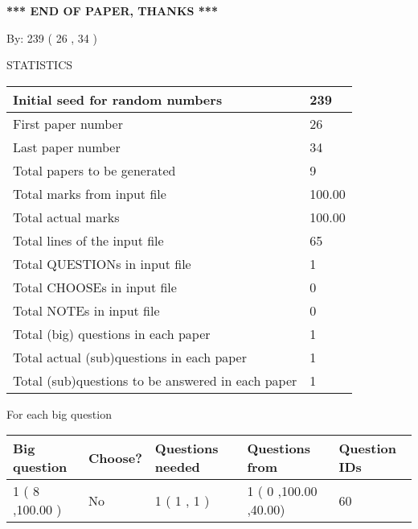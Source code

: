 \documentclass[12pt]{article}
\begin{document}
   
   
   
   
\vspace{1.0in} 
{\textbf{\large{ *** END OF PAPER, THANKS *** }}} 
   
   
\hspace{1.0in} By: 
         239 (          26 ,           34 )
   
   
   
\vspace{0.2in}
\vspace{0.2in}
   
   
 \newpage
\setcounter{page}{1} 
   
   
 {\LARGE{STATISTICS}}
   
\vspace{0.2in}
   
 \begin{tabular}{|l|l|}
 \hline
 Initial seed for random numbers &         239  \\
\hline
 First paper number &          26  \\
\hline
 Last  paper number &          34  \\
\hline
 Total papers to be generated &           9  \\
\hline
Total marks from input file & 100.00 \\
\hline
Total actual marks & 100.00 \\
\hline
 Total lines of the input file &          65  \\
 \hline
 Total QUESTIONs in input file &           1  \\
\hline
 Total CHOOSEs in input file &           0  \\
\hline
 Total NOTEs in input file &           0  \\
\hline
 Total (big) questions in each paper &           1  \\
\hline
 Total actual (sub)questions in each paper &           1  \\
\hline
 Total (sub)questions to be answered in each paper &           1  \\
\hline
 \end{tabular}
   
   
 \newpage
   
{\LARGE{For each big question}}
   
   
\vspace{0.2in}
   
   
\noindent\hspace{-0.4in}\begin{tabular}{|l|l|l|l|l|}
\hline
 Big question & Choose? & Questions needed & Questions from & Question IDs \\ 
\hline
           1 (           8 ,100.00
 ) &  No   & 
           1 (           1 ,            1 ) &            1 (           0
,100.00
 ,40.00) &           60  \\
 \hline
 \end{tabular}
 
 
\end{document}
